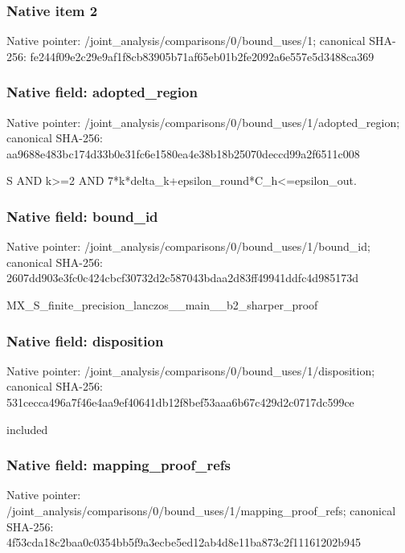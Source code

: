 \documentclass[10pt,a4paper]{article}
\begin{document}
\subsubsection{Native item 2}
Native pointer: /joint\_\allowbreak{}analysis/comparisons/0/bound\_\allowbreak{}uses/1; canonical SHA-256: fe244f09e2c29e9af1f8cb83905b71af65eb01b2fe2092a6e557e5d3488ca369

\subsubsection{Native field: adopted\_\allowbreak{}region}
Native pointer: /joint\_\allowbreak{}analysis/comparisons/0/bound\_\allowbreak{}uses/1/adopted\_\allowbreak{}region; canonical SHA-256: aa9688e483bc174d33b0e31fc6e1580ea4e38b18b25070deccd99a2f6511c008

\begingroup\raggedright\sloppy S AND k>=\allowbreak{}2 AND 7*k*delta\_\allowbreak{}k+epsilon\_\allowbreak{}round*C\_\allowbreak{}h<=\allowbreak{}epsilon\_\allowbreak{}out.\par\endgroup

\subsubsection{Native field: bound\_\allowbreak{}id}
Native pointer: /joint\_\allowbreak{}analysis/comparisons/0/bound\_\allowbreak{}uses/1/bound\_\allowbreak{}id; canonical SHA-256: 2607dd903e3fc0c424cbcf30732d2c587043bdaa2d83ff49941ddfc4d985173d

\begingroup\raggedright\sloppy MX\_\allowbreak{}S\_\allowbreak{}finite\_\allowbreak{}precision\_\allowbreak{}lanczos\_\allowbreak{}\_\allowbreak{}main\_\allowbreak{}\_\allowbreak{}b2\_\allowbreak{}sharper\_\allowbreak{}proof\par\endgroup

\subsubsection{Native field: disposition}
Native pointer: /joint\_\allowbreak{}analysis/comparisons/0/bound\_\allowbreak{}uses/1/disposition; canonical SHA-256: 531cecca496a7f46e4aa9ef40641db12f8bef53aaa6b67c429d2c0717dc599ce

\begingroup\raggedright\sloppy included\par\endgroup

\subsubsection{Native field: mapping\_\allowbreak{}proof\_\allowbreak{}refs}
Native pointer: /joint\_\allowbreak{}analysis/comparisons/0/bound\_\allowbreak{}uses/1/mapping\_\allowbreak{}proof\_\allowbreak{}refs; canonical SHA-256: 4f53cda18c2baa0c0354bb5f9a3ecbe5ed12ab4d8e11ba873c2f11161202b945
\end{document}
